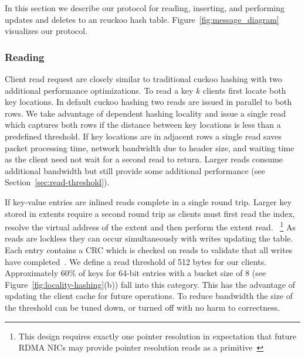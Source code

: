 In this section we describe our protocol for reading,
inserting, and performing updates and deletes to an rcuckoo
hash table. Figure~\ref{fig:message_diagram} visualizes our
protocol.

\subsubsection{Reading} 
\label{sec:reading}

Client read request are closely similar to traditional
cuckoo hashing with two additional performance
optimizations. To read a key $k$ clients first locate both
key locations. In default cuckoo hashing two reads are
issued in parallel to both rows. We take advantage of
dependent hashing locality and issue a single read which
captures both rows if the distance between key locations is
less than a predefined threshold. If key locations are in
adjacent rows a single read saves packet processing time,
network bandwidth due to header size, and waiting time as
the client need not wait for a second read to return. Larger
reads consume additional bandwidth but still provide some
additional performance (see Section~\ref{sec:read-threshold}).

If key-value entries are inlined reads complete in a single
round trip. Larger key stored in extents require a second
round trip as clients must first read the index, resolve the
virtual address of the extent and then perform the extent
read.
~\footnote{This design requires exactly one pointer
resolution in expectation that future RDMA NICs may provide
pointer resolution reads as a primitive~\cite{prism}}
As reads are lockless they can occur simultaneously with
writes updating the table. Each entry contains a CRC which
is checked on reads to validate that all writes have
completed~\cite{pilaf,cell}.
We define a read threshold of 512 bytes for our clients.
Approximately 60\% of keys for 64-bit entries with a bucket
size of 8 (see Figure~\ref{fig:locality-hashing}(b)) fall
into this category. This has the advantage of updating the
client cache for future operations.
To reduce bandwidth the size of the threshold can be tuned
down, or turned off with no harm to correctness.



